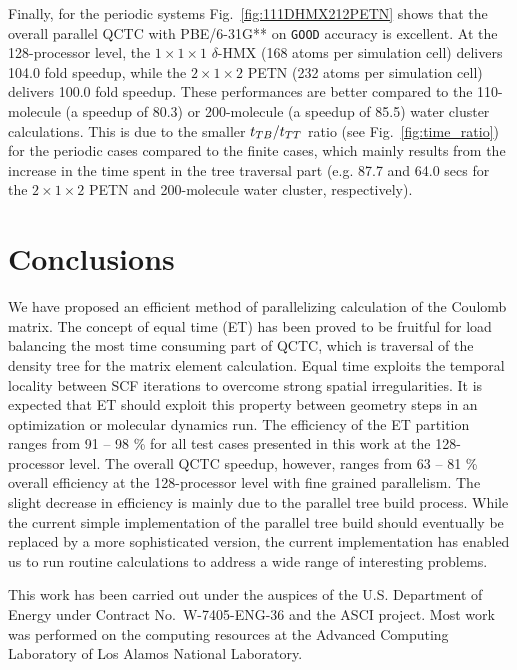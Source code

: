 \commentoutA{\documentclass[prl,aps,twocolumn,twocolumngrid,superbib]{revtex4}}
\begin{document}
Finally, for the periodic systems Fig.~\ref{fig:111DHMX212PETN} shows
that the overall parallel QCTC with PBE/6-31G** on {\tt GOOD} accuracy
is excellent. At the 128-processor level, the $1\times 1\times 1$
$\delta$-HMX (168 atoms per simulation cell) delivers 104.0 fold
speedup, while the $2\times 1 \times 2$ PETN (232 atoms per simulation
cell) delivers 100.0 fold speedup. These performances are better
compared to the 110-molecule (a speedup of 80.3) or 200-molecule (a
speedup of 85.5) water cluster calculations. This is due to the
smaller $t_{TB}/t_{TT}$ ratio (see Fig.~\ref{fig:time_ratio}) for the
periodic cases compared to the finite cases, which mainly results from
the increase in the time spent in the tree traversal part (e.g. 87.7
and 64.0 secs for the $2\times 1 \times 2$ PETN and 200-molecule water
cluster, respectively).

\section{Conclusions}
\label{conclusions}
We have proposed an efficient method of parallelizing calculation of
the Coulomb matrix. The concept of equal time (ET) has been proved to
be fruitful for load balancing the most time consuming part of QCTC,
which is traversal of the density tree for the matrix element
calculation.  Equal time exploits the temporal locality between SCF
iterations to overcome strong spatial irregularities. It is expected
that ET should exploit this property between geometry steps in an
optimization or molecular dynamics run.  The efficiency of the ET
partition ranges from 91 -- 98 \% for all test cases presented in this
work at the 128-processor level. The overall QCTC speedup, however,
ranges from 63 -- 81 \% overall efficiency at the 128-processor level
with fine grained parallelism.  The slight decrease in efficiency is
mainly due to the parallel tree build process.  While the current
simple implementation of the parallel tree build should eventually be
replaced by a more sophisticated version, the current implementation
has enabled us to run routine calculations\cite{CGan04C,CGan04A} to
address a wide range of interesting problems.

\begin{acknowledgments}
This work has been carried out under the auspices of the
U.S. Department of Energy under Contract No.~W-7405-ENG-36 and the
ASCI project.  Most work was performed on the computing resources at
the Advanced Computing Laboratory of Los Alamos National Laboratory.
\end{acknowledgments}

 
\end{document}
